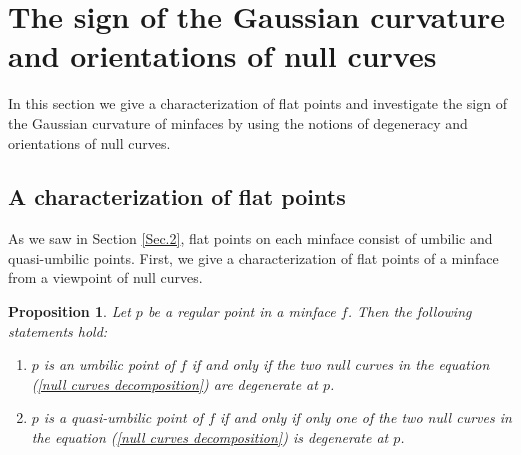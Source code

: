 \documentclass[11pt,reqno]{amsart}
\theoremstyle{plain} %
\newtheorem{proposition}[theorem]{Proposition}
\theoremstyle{definition}
\begin{document}
\section{The sign of the Gaussian curvature and orientations of null curves}\label{Sec.3}
In this section we give a characterization of flat points and investigate the sign of the Gaussian curvature of minfaces by using the notions of degeneracy and orientations of null curves. 
 \subsection{A characterization of flat points}

As we saw in Section \ref{Sec.2}, flat points on each minface consist of umbilic and quasi-umbilic points. First, we give a characterization of flat points of a minface from a viewpoint of null curves.

\begin{proposition}\label{prop:flat points}
Let $p$ be a regular point in a minface $f$. Then the following statements hold:
\begin{enumerate}
\item[(i)] $p$ is an umbilic point of $f$ if and only if the two null curves in the equation (\ref{null curves decomposition}) are degenerate at $p$.
\item[(ii)] $p$ is a quasi-umbilic point of $f$ if and only if only one of the two null curves in the equation (\ref{null curves decomposition}) is degenerate at $p$.
\end{enumerate}
\end{proposition}
\end{document}
